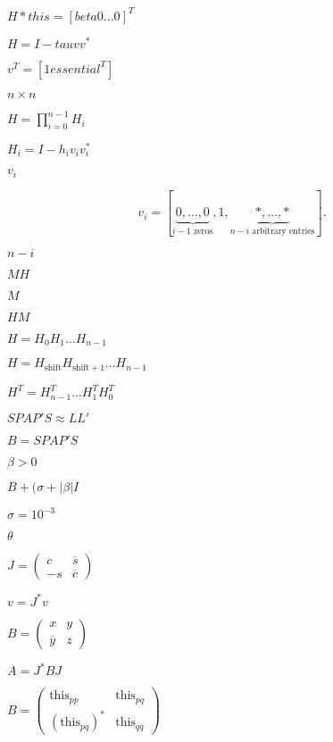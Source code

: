 \documentclass{article}
\begin{document}
$ H *this = [ beta 0 ... 0]^T $
\pagebreak

$ H = I - tau v v^*$
\pagebreak

$ v^T = [1 essential^T] $
\pagebreak

$ n \times n $
\pagebreak

$ H = \prod_{i=0}^{n-1} H_i $
\pagebreak

$ H_i = I - h_i v_i
v_i^* $
\pagebreak

$
v_i $
\pagebreak

\[ 
v_i = [\underbrace{0, \ldots, 0}_{i-1\mbox{ zeros}}, 1, \underbrace{*, \ldots,*}_{n-i\mbox{ arbitrary entries}} ]. 
\]
\pagebreak

$ n-i $
\pagebreak

$ MH $
\pagebreak

$ M $
\pagebreak

$ HM $
\pagebreak

$ H = H_0 H_1 \ldots H_{n-1} $
\pagebreak

$ H = H_{\mathrm{shift}}
H_{\mathrm{shift}+1} \ldots H_{n-1} $
\pagebreak

$ H^T = H_{n-1}^T \ldots H_1^T H_0^T $
\pagebreak

$ S P A P' S \approx L L' $
\pagebreak

$ B = S P A P' S $
\pagebreak

$ \beta > 0 $
\pagebreak

$ B + (\sigma+|\beta| I $
\pagebreak

$ \sigma = 10^{-3} $
\pagebreak

$ \theta $
\pagebreak

$ J = \left ( \begin{array}{cc} c & \overline s \\ -s  & \overline c \end{array} \right ) $
\pagebreak

$ v = J^* v $
\pagebreak

$ B = \left ( \begin{array}{cc} x & y \\ \overline y & z \end{array} \right )$
\pagebreak

$ A = J^* B J $
\pagebreak

$ B = \left ( \begin{array}{cc} \text{this}_{pp} & \text{this}_{pq} \\ (\text{this}_{pq})^* & \text{this}_{qq} \end{array} \right )$
\pagebreak
\end{document}
